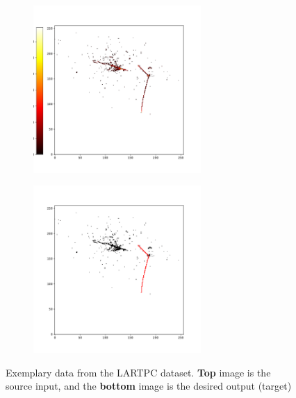 \begin{figure}[H]
\centering
\begin{subfigure}[b]{\textwidth}
\centering
\includegraphics[width=0.7\textwidth]{figures/chapter7/examplary_data_x.pdf}
  \end{subfigure}

\begin{subfigure}[b]{\textwidth}
\centering
\includegraphics[width=0.7\textwidth]{figures/chapter7/examplary_data_y.pdf}
  \end{subfigure}
\caption{Exemplary data from the LARTPC dataset. \textbf{Top} image is the source input, and the \textbf{bottom} image is the desired output (target)}
\label{fig:lartpc-data-example}
\end{figure}

